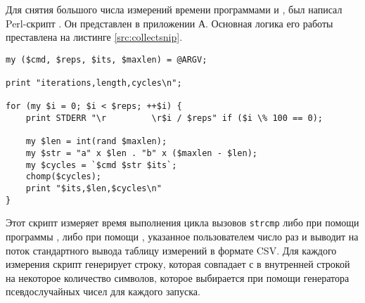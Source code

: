 Для снятия большого числа измерений времени программами  и
, был написал Perl-скрипт . Он представлен в приложении А. Основная
логика его работы преставлена на листинге \ref{src:collectsnip}.

\nopagebreak

\begin{lstlisting}[caption=Фрагмент скрипта \texttt{collect.pl}, label=src:collectsnip]
my ($cmd, $reps, $its, $maxlen) = @ARGV;

print "iterations,length,cycles\n";

for (my $i = 0; $i < $reps; ++$i) {
	print STDERR "\r         \r$i / $reps" if ($i \% 100 == 0);

	my $len = int(rand $maxlen);
	my $str = "a" x $len . "b" x ($maxlen - $len);
	my $cycles = `$cmd $str $its`;
	chomp($cycles);
	print "$its,$len,$cycles\n"
}
\end{lstlisting}

Этот скрипт измеряет время выполнения цикла вызовов \texttt{strcmp} либо при
помощи программы , либо при помощи ,
указанное пользователем число раз и выводит на поток стандартного вывода таблицу
измерений в формате CSV. Для каждого измерения скрипт генерирует строку, которая
совпадает с в внутренней строкой  на некоторое количество
символов, которое выбирается при помощи генератора псевдослучайных чисел для
каждого запуска.

\clearpage
